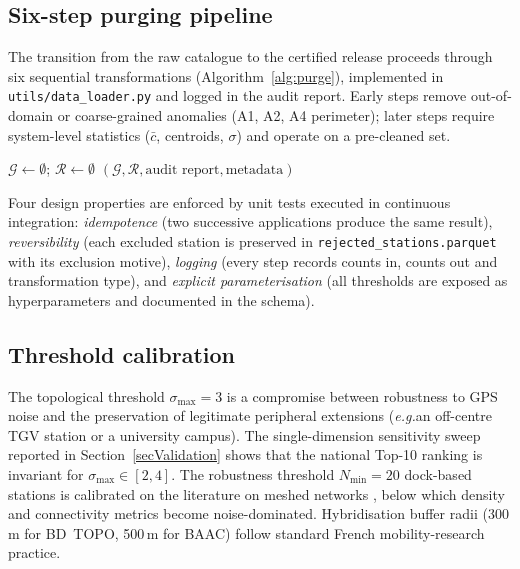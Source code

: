 \documentclass[11pt,a4paper]{article}
\newcommand{\eg}{\emph{e.g.}}
\begin{document}
\subsection{Six-step purging pipeline}
The transition from the raw catalogue to the certified release
proceeds through six sequential transformations
(Algorithm~\ref{alg:purge}), implemented in
\texttt{utils/data\_loader.py} and logged in the audit report. Early
steps remove out-of-domain or coarse-grained anomalies (A1, A2, A4
perimeter); later steps require system-level statistics
($\bar c$, centroids, $\sigma$) and operate on a pre-cleaned set.

\begin{algorithm}[ht]
\SetAlgoLined
\DontPrintSemicolon
{}
$\mathcal{G} \gets \emptyset$; $\mathcal{R} \gets \emptyset$\;
\Return $(\mathcal{G}, \mathcal{R}, \text{audit report}, \text{metadata})$\;
\caption{GBFS-to-Gold-Standard purging pipeline.}
\label{alg:purge}
\end{algorithm}

Four design properties are enforced by unit tests executed in
continuous integration: \emph{idempotence} (two successive applications
produce the same result), \emph{reversibility} (each excluded station
is preserved in \texttt{rejected\_stations.parquet} with its exclusion
motive), \emph{logging} (every step records counts in, counts out and
transformation type), and \emph{explicit parameterisation} (all
thresholds are exposed as hyperparameters and documented in the
schema).

\subsection{Threshold calibration}
The topological threshold $\sigma_{\max} = 3$ is a compromise between
robustness to GPS noise and the preservation of legitimate peripheral
extensions (\eg an off-centre TGV station or a university campus).
The single-dimension sensitivity sweep reported in
Section~\ref{secValidation} shows that the national Top-10 ranking is
invariant for $\sigma_{\max} \in [2, 4]$. The robustness threshold
$N_{\min} = 20$ dock-based stations is calibrated on the literature
on meshed networks \cite{Saberi2018}, below which density and
connectivity metrics become noise-dominated. Hybridisation buffer
radii (300\,m for BD~TOPO, 500\,m for BAAC) follow standard French
mobility-research practice.
\end{document}
